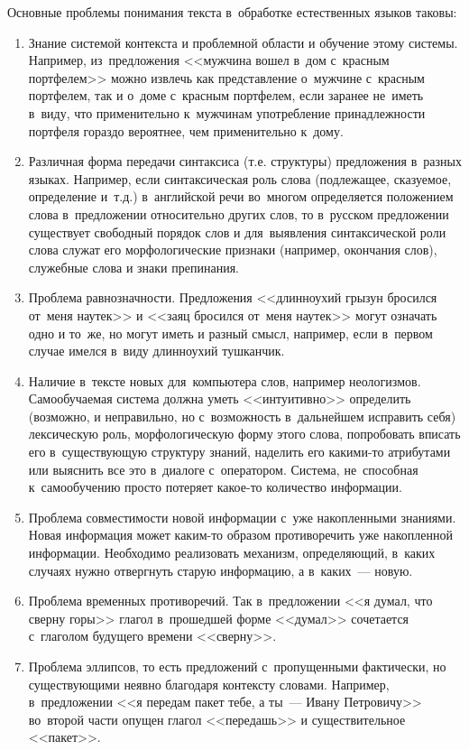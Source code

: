\documentclass[12pt]{article}
\theoremstyle{definition}
\theoremstyle{remark}
\numberwithin{equation}{section}
\begin{document}
Основные проблемы понимания текста в~обработке естественных языков таковы:
\begin{enumerate}
    \item Знание системой контекста и проблемной области и обучение
    этому системы. Например, из~предложения <<мужчина вошел в~дом
    с~красным портфелем>> можно извлечь как представление о~мужчине
    с~красным портфелем, так и о~доме с~красным портфелем, если
    заранее не~иметь в~виду, что применительно к~мужчинам употребление
    принадлежности портфеля гораздо вероятнее, чем применительно к~дому.
    \item Различная форма передачи синтаксиса (т.е. структуры) предложения
    в~разных языках. Например, если синтаксическая роль слова (подлежащее,
    сказуемое, определение и~т.д.) в~английской речи во~многом определяется
    положением слова в~предложении относительно других слов, то в~русском
    предложении существует свободный порядок слов и для~выявления
    синтаксической роли слова служат его морфологические признаки
    (например, окончания слов), служебные слова и знаки препинания.
    \item Проблема равнозначности. Предложения <<длинноухий грызун
    бросился от~меня наутек>> и <<заяц бросился от~меня наутек>>
    могут означать одно и то~же, но могут иметь и разный смысл,
    например, если в~первом случае имелся в~виду длинноухий
    тушканчик.
    \item Наличие в~тексте новых для~компьютера слов, например неологизмов.
    Самообучаемая система должна уметь <<интуитивно>> определить
    (возможно, и неправильно, но с~возможность в~дальнейшем исправить себя)
    лексическую роль, морфологическую форму этого слова, попробовать вписать
    его в~существующую структуру знаний, наделить его какими-то атрибутами
    или выяснить все это в~диалоге с~оператором. Система, не~способная
    к~самообучению просто потеряет какое-то количество информации.
    \item Проблема совместимости новой информации с~уже накопленными
    знаниями. Новая информация может каким-то образом противоречить
    уже накопленной информации. Необходимо реализовать механизм, определяющий,
    в~каких случаях нужно отвергнуть старую информацию, а в~каких~--- новую.
    \item Проблема временных противоречий. Так в~предложении <<я думал,
    что сверну горы>> глагол в~прошедшей форме <<думал>> сочетается
    с~глаголом будущего времени <<сверну>>.
    \item Проблема эллипсов, то есть предложений с~пропущенными фактически,
    но существующими неявно благодаря контексту словами. Например,
    в~предложении <<я передам пакет тебе, а ты~--- Ивану Петровичу>>
    во~второй части опущен глагол <<передашь>> и существительное <<пакет>>.
\end{enumerate}
\end{document}
